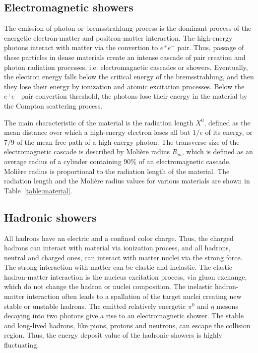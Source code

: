 \subsection{Electromagnetic showers}
The emission of photon or bremsstrahlung process is the dominant process of the energetic electron-matter and positron-matter interaction.
The high-energy photons interact with matter via the convertion to $e^+e^-$ pair.
Thus, passage of these particles in dense materials create an intense cascade of pair creation and photon radiation processes, i.e. electromagnetic cascades or showers.
Eventually, the electron energy falls below the critical energy of the bremsstrahlung, and then they lose their energy by ionization and atomic excitation processes.
Below the $e^+e^-$ pair convertion threshold, the photons lose their energy in the material by the Compton scattering process. 

The main characteristic of the material is the radiation length $X^0$, defined as the mean distance over which a high-energy electron loses all but $1/e$ of its energy, or $7/9$ of the mean free path of a high-energy photon. 
The transverse size of the electromagnetic cascade is described by Moli\`ere radius $R_{m}$, which is defined as an average radius of a cylinder containing 90\% of an electromagnetic cascade. Moli\`ere radius is proportional to the radiation length of the material. 
The radiation length and the Moli\`ere radius values for various materials are shown in Table~\ref{table:material}.


\subsection{Hadronic showers}
All hadrons have an electric and a confined color charge. 
Thus, the charged hadrons can interact with material via ionization process, and all hadrons, neutral and charged ones, can interact with matter nuclei via the strong force.
The strong interaction with matter can be elastic and inelastic. 
The elastic hadron-matter interaction is the nucleus excitation process, via gluon exchange, which do not change the hadron or nuclei composition. 
The inelastic hadron-matter interaction often leads to a spallation of the target nuclei creating new stable or unstable hadrons. 
The emitted relatively energetic  $\pi^0$ and $\eta$ mesons decaying into two photons give a rise to an electromagnetic shower. 
The stable and long-lived hadrons, like pions, protons and neutrons, can escape the collision region. 
Thus, the energy deposit value of the hadronic showers is highly fluctuating. 

